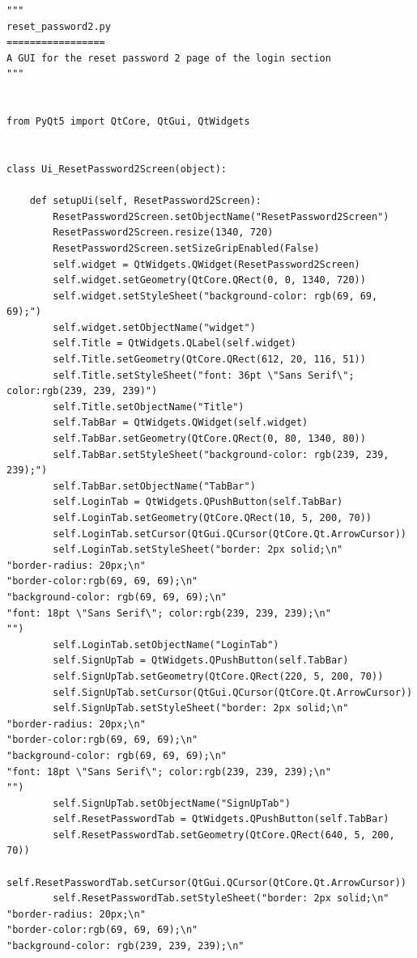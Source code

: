 \documentclass{article}
\begin{document}
\begin{lstlisting}
"""
reset_password2.py
=================
A GUI for the reset password 2 page of the login section
"""


from PyQt5 import QtCore, QtGui, QtWidgets


class Ui_ResetPassword2Screen(object):

    def setupUi(self, ResetPassword2Screen):
        ResetPassword2Screen.setObjectName("ResetPassword2Screen")
        ResetPassword2Screen.resize(1340, 720)
        ResetPassword2Screen.setSizeGripEnabled(False)
        self.widget = QtWidgets.QWidget(ResetPassword2Screen)
        self.widget.setGeometry(QtCore.QRect(0, 0, 1340, 720))
        self.widget.setStyleSheet("background-color: rgb(69, 69, 69);")
        self.widget.setObjectName("widget")
        self.Title = QtWidgets.QLabel(self.widget)
        self.Title.setGeometry(QtCore.QRect(612, 20, 116, 51))
        self.Title.setStyleSheet("font: 36pt \"Sans Serif\"; color:rgb(239, 239, 239)")
        self.Title.setObjectName("Title")
        self.TabBar = QtWidgets.QWidget(self.widget)
        self.TabBar.setGeometry(QtCore.QRect(0, 80, 1340, 80))
        self.TabBar.setStyleSheet("background-color: rgb(239, 239, 239);")
        self.TabBar.setObjectName("TabBar")
        self.LoginTab = QtWidgets.QPushButton(self.TabBar)
        self.LoginTab.setGeometry(QtCore.QRect(10, 5, 200, 70))
        self.LoginTab.setCursor(QtGui.QCursor(QtCore.Qt.ArrowCursor))
        self.LoginTab.setStyleSheet("border: 2px solid;\n"
"border-radius: 20px;\n"
"border-color:rgb(69, 69, 69);\n"
"background-color: rgb(69, 69, 69);\n"
"font: 18pt \"Sans Serif\"; color:rgb(239, 239, 239);\n"
"")
        self.LoginTab.setObjectName("LoginTab")
        self.SignUpTab = QtWidgets.QPushButton(self.TabBar)
        self.SignUpTab.setGeometry(QtCore.QRect(220, 5, 200, 70))
        self.SignUpTab.setCursor(QtGui.QCursor(QtCore.Qt.ArrowCursor))
        self.SignUpTab.setStyleSheet("border: 2px solid;\n"
"border-radius: 20px;\n"
"border-color:rgb(69, 69, 69);\n"
"background-color: rgb(69, 69, 69);\n"
"font: 18pt \"Sans Serif\"; color:rgb(239, 239, 239);\n"
"")
        self.SignUpTab.setObjectName("SignUpTab")
        self.ResetPasswordTab = QtWidgets.QPushButton(self.TabBar)
        self.ResetPasswordTab.setGeometry(QtCore.QRect(640, 5, 200, 70))
        self.ResetPasswordTab.setCursor(QtGui.QCursor(QtCore.Qt.ArrowCursor))
        self.ResetPasswordTab.setStyleSheet("border: 2px solid;\n"
"border-radius: 20px;\n"
"border-color:rgb(69, 69, 69);\n"
"background-color: rgb(239, 239, 239);\n"

\end{lstlisting}
\end{document}

